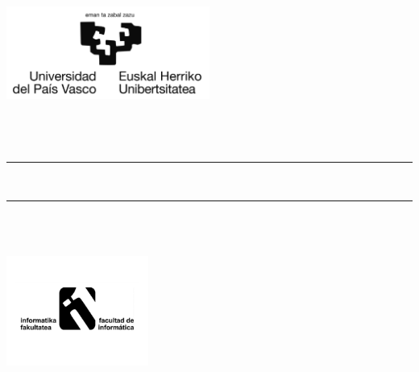 \thispagestyle{empty}

\newcommand{\HRule}{\rule{\linewidth}{0.5mm}} 

\begin{center}
  \includegraphics[width=0.5\textwidth]{template/figs/ehu-logo-osoa.jpg} \\[1.3cm]
   {\Large \masterName}\\
   {\masterSpecialization}\\[1.5cm]

  {\large {\mapizenburua}}\\[0.2cm]
\HRule \\[0.5cm]

{ \LARGE 
\begin{spacing}{1}
  \textbf{\izenburua}
\end{spacing}
}
 \vspace{0.5cm}
\HRule \\[1.0cm]

{ \authorLabel\\}
{\Large \textsl{\egilea}}
\vspace{2.0 cm} 

\includegraphics[width=0.35\textwidth]{template/figs/logo_infor.pdf} \\[0.1cm]
{\large \textsf{\masterDate}}

\end{center}

